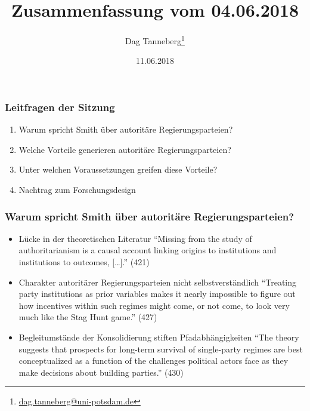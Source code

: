 \documentclass{beamer}
\title{Zusammenfassung vom 04.06.2018}
\author{Dag Tanneberg\thanks{%
  \href{mailto:dag.tanneberg@uni-potsdam.de}%
    {dag.tanneberg@uni-potsdam.de}
  }
}
\institute[Universität Potsdam]{
  {\glqq}Wie erkl\"art man autorit\"are Herrschaft?{\grqq}\\
  Universität Potsdam\\
  Lehrstuhl für Vergleichende Politikwissenschaft\\
  Sommersemester 2018
}
\date{11.06.2018}
\begin{document}
\maketitle

\begin{frame}
  \frametitle{Leitfragen der Sitzung}
  \begin{enumerate}
    \item Warum spricht Smith über autoritäre Regierungsparteien?
    \item Welche Vorteile generieren autoritäre Regierungsparteien?
    \item Unter welchen Voraussetzungen greifen diese Vorteile?
    \item Nachtrag zum Forschungsdesign
  \end{enumerate}
\end{frame}

\begin{frame}
  \frametitle{Warum spricht Smith über autoritäre Regierungsparteien?}
  \begin{itemize}
    \item Lücke in der theoretischen Literatur \newline
      \small{
        ``Missing from the study of authoritarianism is a causal
        account linking origins to institutions and institutions to
        outcomes, [\dots].'' (421)
      }
    \item Charakter autoritärer Regierungsparteien nicht selbstverständlich \newline
    \small{
      ``Treating party institutions as prior variables makes it
      nearly impossible to figure out how incentives within such
      regimes might come, or not come, to look very much like
      the Stag Hunt game.'' (427)
    }
    \item Begleitumstände der Konsolidierung stiften Pfadabhängigkeiten \newline
    \small{
      ``The theory suggests that prospects for long-term
      survival of single-party regimes are best
      conceptualized as a function of the challenges
      political actors face as they make decisions about
      building parties.'' (430)
    }
  \end{itemize}
\end{frame}
\end{document}
